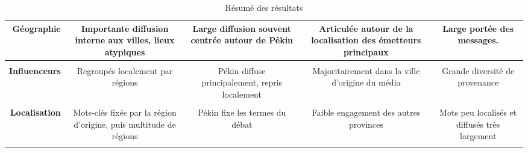 {\begin{table}[h!]
\begin{tabulary}{\linewidth}{ r | C C C C}
        \textbf{Géographie} &
        Importante diffusion interne aux villes, lieux atypiques  &
        Large diffusion souvent centrée autour de Pékin &
        Articulée autour de la localisation des émetteurs principaux &
        Large portée des messages. \\
        \hline \\[-1.2ex]

        \textbf{Influenceurs} &
        Regroupés localement par régions & 
        Pékin diffuse principalement, repris localement  &
        Majoritairement dans la ville d'origine du média &
        Grande diversité de provenance \\
        \hline \\[-1.2ex]

        \textbf{Localisation} &
        Mots-clés fixés par la région d'origine, puis multitude de régions &
        Pékin fixe les termes du débat &
        Faible engagement des autres provinces &
        Mots peu localisés et diffusés très largement \\
        \hline \\[-1.2ex]


    \end{tabulary}
    \caption[Résumé des résultats]{Résumé des résultats}
    \label{fig:viz-results}
\end{table}
}
